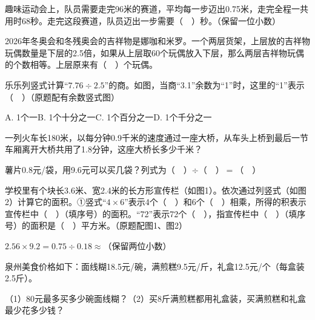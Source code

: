 \vspace{5cm}
\begin{mistake}
趣味运动会上，队员需要走完96米的赛道，平均每一步迈出0.75米，走完全程一共用时68秒。走完这段赛道，队员迈出一步需要（$\quad$）秒。（保留一位小数）
\end{mistake}

\vspace{5cm}
\begin{mistake}
2026年冬奥会和冬残奥会的吉祥物是娜咖和米罗。一个两层货架，上层放的吉祥物玩偶数量是下层的2.5倍，如果从上层取60个玩偶放入下层，那么两层吉祥物玩偶的个数相等。上层原来有（$\quad$）个玩偶。
\end{mistake}

\vspace{5cm}
\begin{mistake}
乐乐列竖式计算“$7.76\div2.5$”的商。如图，当商“3.1”余数为“1”时，这里的“1”表示（$\quad$）（原题配有余数竖式图）

A. 1个一\quad B. 1个十分之一\quad C. 1个百分之一\quad D. 1个千分之一
\end{mistake}

\vspace{5cm}
\begin{mistake}
一列火车长180米，以每分钟0.9千米的速度通过一座大桥，从车头上桥到最后一节车厢离开大桥共用了1.8分钟，这座大桥长多少千米？
\end{mistake}

\vspace{5cm}
\begin{mistake}
薯片0.8元/袋，用9.6元可以买几袋？列式为（$\quad$）$\div$（$\quad$）$=$（$\quad$）
\end{mistake}

\vspace{5cm}
\begin{mistake}
学校里有个块长3.6米、宽2.4米的长方形宣传栏（如图1）。依次通过列竖式（如图2）计算它的面积。①竖式“$4\times6$”表示4个（$\quad$）和6个（$\quad$）相乘，所得的积表示宣传栏中（$\quad$）（填序号）的面积。“72”表示72个（$\quad$），指宣传栏中（$\quad$）（填序号）的面积是（$\quad$）平方米。（原题配图1、图2）
\end{mistake}

\vspace{5cm}
\begin{mistake}
$2.56\times9.2=$\quad $0.75\div0.18\approx$（保留两位小数）
\end{mistake}

\vspace{5cm}
\begin{mistake}
泉州美食价格如下：面线糊18.5元/碗，满煎糕9.5元/斤，礼盒12.5元/个（每盒装2.5斤）。

（1）80元最多买多少碗面线糊？（2）买8斤满煎糕都用礼盒装，买满煎糕和礼盒最少花多少钱？
\end{mistake}

